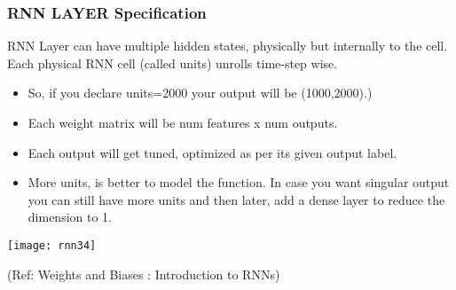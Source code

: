 \begin{frame}[fragile] \frametitle{RNN LAYER Specification}
RNN Layer can have multiple hidden states, physically but internally to the cell. Each physical RNN cell (called units) unrolls time-step wise.

\begin{itemize}
\item So, if you declare units=2000 your output will be (1000,2000).)
\item Each weight matrix will be num features x num outputs.
\item Each output will get tuned, optimized as per its given output label.
\item More units, is better to model the function. In case you want singular output you can still have more units and then later, add a dense layer to reduce the dimension to 1.
\end{itemize}

\begin{center}
\texttt{[image: rnn34]}

{\tiny (Ref: Weights and Biases : Introduction to RNNs)}

\end{center}


\end{frame}



